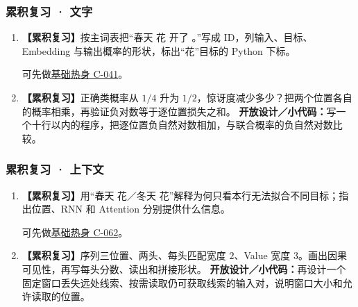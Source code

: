 \subsubsection*{累积复习 · 文字}
\begin{enumerate}[label={},leftmargin=4.8em,itemsep=4pt]
\item[\textbf{R-05.}] \leavevmode{}\label{exercise:R-05}\label{exercise:review-token-pipeline}\textbf{【累积复习】}按主词表把“春天 花 开了 。”写成 ID，列输入、目标、Embedding 与输出概率的形状，标出“花”目标的 Python 下标。\par 可先做\hyperref[exercise:shifted-token-targets]{基础热身 C-041}。
\item[\textbf{R-06.}] \leavevmode{}\label{exercise:R-06}\label{exercise:review-cross-entropy}\textbf{【累积复习】}正确类概率从 $1/4$ 升为 $1/2$，惊讶度减少多少？把两个位置各自的概率相乘，再验证负对数等于逐位置损失之和。
\textbf{开放设计／小代码：}写一个十行以内的程序，把逐位置负自然对数相加，与联合概率的负自然对数比较。
\end{enumerate}
\subsubsection*{累积复习 · 上下文}
\begin{enumerate}[label={},leftmargin=4.8em,itemsep=4pt]
\item[\textbf{R-07.}] \leavevmode{}\label{exercise:R-07}\label{exercise:review-context-evidence}\textbf{【累积复习】}用“春天 花／冬天 花”解释为何只看本行无法拟合不同目标；指出位置、RNN 和 Attention 分别提供什么信息。\par 可先做\hyperref[exercise:attention-shapes]{基础热身 C-062}。
\item[\textbf{R-08.}] \leavevmode{}\label{exercise:R-08}\label{exercise:review-multihead-shapes}\textbf{【累积复习】}序列三位置、两头、每头匹配宽度 $2$、Value 宽度 $3$。画出因果可见性，再写每头分数、读出和拼接形状。
\textbf{开放设计／小代码：}再设计一个固定窗口丢失远处线索、按需读取仍可获取线索的输入对，说明窗口大小和允许读取的位置。
\end{enumerate}
